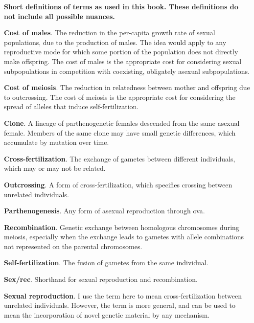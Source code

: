 \documentclass[
  letterpaper,
]{book}
\begin{document}
\begin{tcolorbox}[enhanced jigsaw, breakable, colback=white, leftrule=.75mm, opacityback=0, titlerule=0mm, bottomtitle=1mm, toprule=.15mm, rightrule=.15mm, toptitle=1mm, title=\textcolor{quarto-callout-tip-color}{\faLightbulb}\hspace{0.5em}{Box 1.1}, colframe=quarto-callout-tip-color-frame, opacitybacktitle=0.6, arc=.35mm, coltitle=black, left=2mm, bottomrule=.15mm, colbacktitle=quarto-callout-tip-color!10!white]

\textbf{Short definitions of terms as used in this book. These
definitions do not include all possible nuances.}

\textbf{Cost of males}. The reduction in the per-capita growth rate of
sexual populations, due to the production of males. The idea would apply
to any reproductive mode for which some portion of the population does
not directly make offspring. The cost of males is the appropriate cost
for considering sexual subpopulations in competition with coexisting,
obligately asexual subpopulations.

\textbf{Cost of meiosis}. The reduction in relatedness between mother
and offspring due to outcrossing. The cost of meiosis is the appropriate
cost for considering the spread of alleles that induce
self-fertilization.

\textbf{Clone}. A lineage of parthenogenetic females descended from the
same asexual female. Members of the same clone may have small genetic
differences, which accumulate by mutation over time.

\textbf{Cross-fertilization}. The exchange of gametes between different
individuals, which may or may not be related.

\textbf{Outcrossing}. A form of cross-fertilization, which specifies
crossing between unrelated individuals.

\textbf{Parthenogenesis}. Any form of asexual reproduction through ova.

\textbf{Recombination}. Genetic exchange between homologous chromosomes
during meiosis, especially when the exchange leads to gametes with
allele combinations not represented on the parental chromosomes.

\textbf{Self-fertilization}. The fusion of gametes from the same
individual.

\textbf{Sex/rec}. Shorthand for sexual reproduction and recombination.

\textbf{Sexual reproduction}. I use the term here to mean
cross-fertilization between unrelated individuals. However, the term is
more general, and can be used to mean the incorporation of novel genetic
material by any mechanism.

\end{tcolorbox}
\end{document}
